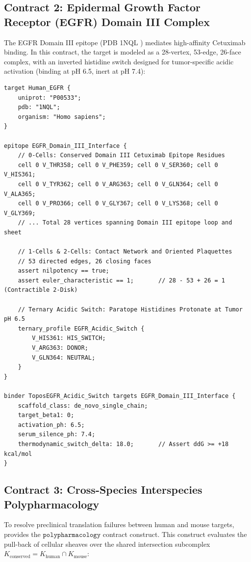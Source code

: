 \subsection{Contract 2: Epidermal Growth Factor Receptor (EGFR) Domain III Complex}
The EGFR Domain III epitope (PDB 1NQL \cite{ferguson2008structural, li2005structural}) mediates high-affinity Cetuximab binding. In this contract, the target is modeled as a 28-vertex, 53-edge, 26-face complex, with an inverted histidine switch designed for tumor-specific acidic activation (binding at pH 6.5, inert at pH 7.4):

\begin{lstlisting}[style=toposstyle, caption={ToposLang Cellular Contract for EGFR Domain III Acidic Activation.}]
target Human_EGFR {
    uniprot: "P00533";
    pdb: "1NQL";
    organism: "Homo sapiens";
}

epitope EGFR_Domain_III_Interface {
    // 0-Cells: Conserved Domain III Cetuximab Epitope Residues
    cell 0 V_THR358; cell 0 V_PHE359; cell 0 V_SER360; cell 0 V_HIS361;
    cell 0 V_TYR362; cell 0 V_ARG363; cell 0 V_GLN364; cell 0 V_ALA365;
    cell 0 V_PRO366; cell 0 V_GLY367; cell 0 V_LYS368; cell 0 V_GLY369;
    // ... Total 28 vertices spanning Domain III epitope loop and sheet

    // 1-Cells & 2-Cells: Contact Network and Oriented Plaquettes
    // 53 directed edges, 26 closing faces
    assert nilpotency == true;
    assert euler_characteristic == 1;       // 28 - 53 + 26 = 1 (Contractible 2-Disk)

    // Ternary Acidic Switch: Paratope Histidines Protonate at Tumor pH 6.5
    ternary_profile EGFR_Acidic_Switch {
        V_HIS361: HIS_SWITCH;
        V_ARG363: DONOR;
        V_GLN364: NEUTRAL;
    }
}

binder ToposEGFR_Acidic_Switch targets EGFR_Domain_III_Interface {
    scaffold_class: de_novo_single_chain;
    target_beta1: 0;
    activation_ph: 6.5;
    serum_silence_ph: 7.4;
    thermodynamic_switch_delta: 18.0;       // Assert ddG >= +18 kcal/mol
}
\end{lstlisting}

\subsection{Contract 3: Cross-Species Interspecies Polypharmacology}
To resolve preclinical translation failures between human and mouse targets, \ToposLang{} provides the $\texttt{polypharmacology}$ contract construct. This construct evaluates the pull-back of cellular sheaves over the shared intersection subcomplex $K_{\text{conserved}} = K_{\text{human}} \cap K_{\text{mouse}}$:

